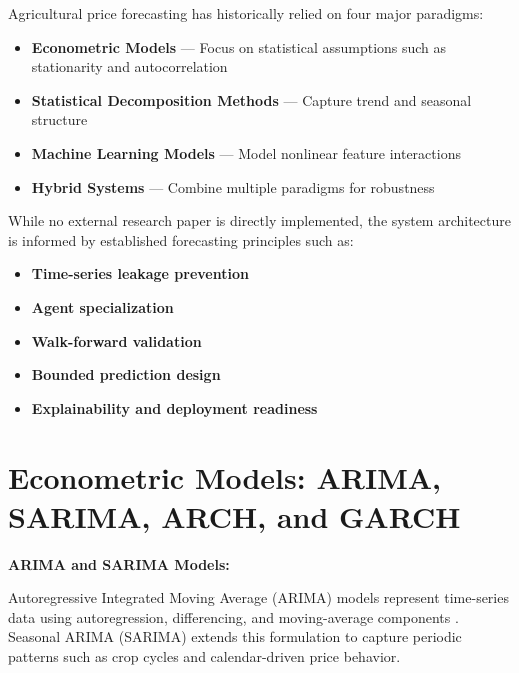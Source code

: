 \documentclass[12pt,a4paper]{report}
\begin{document}
\noindent
Agricultural price forecasting has historically relied on four major paradigms:

\begin{itemize}
    \item \textbf{Econometric Models} — Focus on statistical assumptions such as stationarity and autocorrelation
    \item \textbf{Statistical Decomposition Methods} — Capture trend and seasonal structure
    \item \textbf{Machine Learning Models} — Model nonlinear feature interactions
    \item \textbf{Hybrid Systems} — Combine multiple paradigms for robustness
\end{itemize}

\vspace{0.5em}

\noindent
While no external research paper is directly implemented, the system architecture is informed by established forecasting principles such as:

\begin{itemize}
    \item \textbf{Time-series leakage prevention}
    \item \textbf{Agent specialization}
    \item \textbf{Walk-forward validation}
    \item \textbf{Bounded prediction design}
    \item \textbf{Explainability and deployment readiness}
\end{itemize}

\vspace{0.7em}


\section{Econometric Models: ARIMA, SARIMA, ARCH, and GARCH}

\noindent
\textbf{ARIMA and SARIMA Models:}

\vspace{0.3em}

\noindent
Autoregressive Integrated Moving Average (ARIMA) models represent time-series data using autoregression, differencing, and moving-average components \cite{box2015}. Seasonal ARIMA (SARIMA) extends this formulation to capture periodic patterns such as crop cycles and calendar-driven price behavior.
\end{document}
